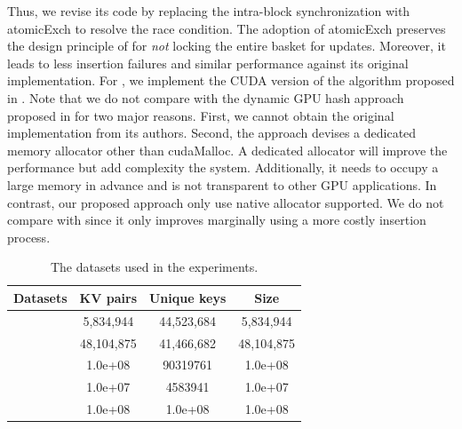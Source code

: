Thus, we revise its code by replacing the intra-block synchronization with atomicExch to resolve the race condition. The adoption of atomicExch preserves the design principle of \megakv for \emph{not} locking the entire basket for updates. Moreover, it leads to less insertion failures and similar performance against its original implementation. 
For \linear, we implement the CUDA version of the algorithm proposed in \cite{hong2010mapcg}.
Note that we do not compare with the dynamic GPU hash approach proposed in \cite{ashkiani2018dynamic} for two major reasons. First, we cannot obtain the original implementation from its authors. Second, the approach devises a dedicated memory allocator other than cudaMalloc. A dedicated allocator will improve the performance but add complexity the system. Additionally, it needs to occupy a large memory in advance and is not transparent to other GPU applications.
In contrast, our proposed approach only use native allocator supported. 
We do not compare with \cite{breslow2016horton} since it only improves \megakv marginally using a more costly insertion process.

\begin{table}[t]
	\caption{The datasets used in the experiments.}
	\label{table:exp_data_sets}
	\centering
	\begin{tabular}{|c|c|c|c|}
		\hline
		Datasets & KV pairs & Unique keys & Size \\ \hline
		\dstwitter &5,834,944 & 44,523,684&5,834,944\\ \hline
		\dsreddit & 48,104,875 & 41,466,682 & 48,104,875\\ \hline
		\dstpch &1.0e+08 & 90319761&1.0e+08 \\ \hline
		\dsali &1.0e+07 & 4583941&1.0e+07 \\ \hline
		\dsrandom & 1.0e+08& 1.0e+08&1.0e+08 \\ \hline
	\end{tabular}
\end{table}

